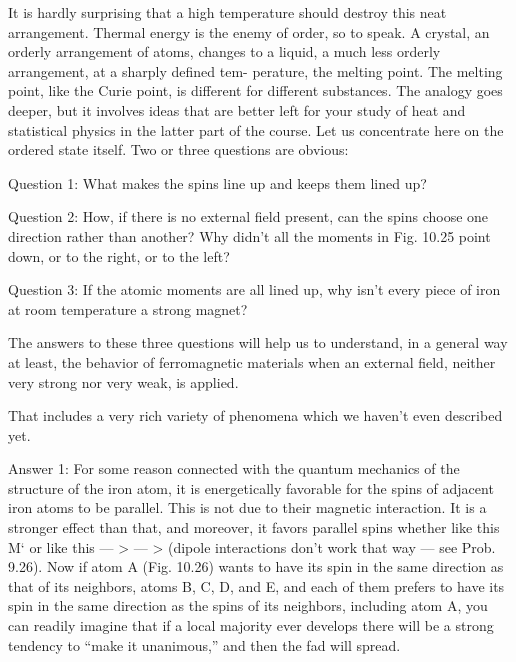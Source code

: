 It is hardly surprising that a high temperature should destroy this
neat arrangement. Thermal energy is the enemy of order, so
to speak. A crystal, an orderly arrangement of atoms, changes to a
liquid, a much less orderly arrangement, at a sharply defined tem-
perature, the melting point. The melting point, like the Curie point,
is different for different substances. The analogy goes deeper, but it
involves ideas that are better left for your study of heat and statistical
physics in the latter part of the course. Let us concentrate here on
the ordered state itself. Two or three questions are obvious:

Question 1: What makes the spins line up and keeps them lined
up?

Question 2: How, if there is no external field present, can the
spins choose one direction rather than another? Why didn't all the
moments in Fig. 10.25 point down, or to the right, or to the left?

Question 3: If the atomic moments are all lined up, why isn't every
piece of iron at room temperature a strong magnet?

The answers to these three questions will help us to understand,
in a general way at least, the behavior of ferromagnetic materials
when an external field, neither very strong nor very weak, is applied.

That includes a very rich variety of phenomena which we haven't
even described yet.

Answer 1: For some reason connected with the quantum mechanics
of the structure of the iron atom, it is energetically favorable
for the spins of adjacent iron atoms to be parallel. This is not due
to their magnetic interaction. It is a stronger effect than that, and
moreover, it favors parallel spins whether like this M‘ or like this  --- > --- >
(dipole interactions don't work that way --- see Prob. 9.26). Now if
atom A (Fig. 10.26) wants to have its spin in the same direction as
that of its neighbors, atoms B, C, D, and E, and each of them prefers
to have its spin in the same direction as the spins of its neighbors,
including atom A, you can readily imagine that if a local majority
ever develops there will be a strong tendency to ``make it 
unanimous,'' and then the fad will spread.

